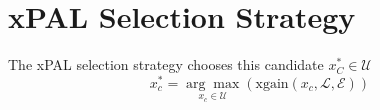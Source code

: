 \section{xPAL Selection Strategy}

The xPAL selection strategy chooses this candidate $x^*_C \in \mathcal{U}$
\begin{equation}
    x^*_c = \underset{x_c \in \mathcal{U}}{\arg \max} \left( \text{xgain} (x_c, \mathcal{L}, \mathcal{E}) \right)
\end{equation}
